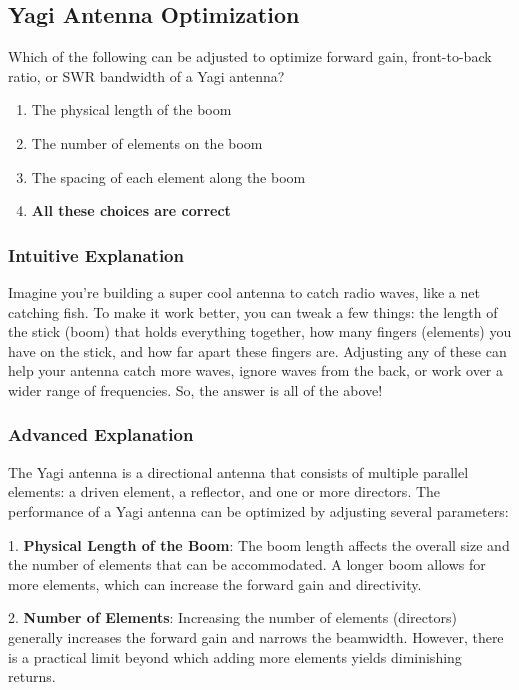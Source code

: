 \subsection{Yagi Antenna Optimization}
\label{G9C10}

\begin{tcolorbox}[colback=gray!10!white,colframe=black!75!black,title=G9C10]
Which of the following can be adjusted to optimize forward gain, front-to-back ratio, or SWR bandwidth of a Yagi antenna?
\begin{enumerate}[label=\Alph*.]
    \item The physical length of the boom
    \item The number of elements on the boom
    \item The spacing of each element along the boom
    \item \textbf{All these choices are correct}
\end{enumerate}
\end{tcolorbox}

\subsubsection{Intuitive Explanation}
Imagine you're building a super cool antenna to catch radio waves, like a net catching fish. To make it work better, you can tweak a few things: the length of the stick (boom) that holds everything together, how many fingers (elements) you have on the stick, and how far apart these fingers are. Adjusting any of these can help your antenna catch more waves, ignore waves from the back, or work over a wider range of frequencies. So, the answer is all of the above!

\subsubsection{Advanced Explanation}
The Yagi antenna is a directional antenna that consists of multiple parallel elements: a driven element, a reflector, and one or more directors. The performance of a Yagi antenna can be optimized by adjusting several parameters:

1. \textbf{Physical Length of the Boom}: The boom length affects the overall size and the number of elements that can be accommodated. A longer boom allows for more elements, which can increase the forward gain and directivity.

2. \textbf{Number of Elements}: Increasing the number of elements (directors) generally increases the forward gain and narrows the beamwidth. However, there is a practical limit beyond which adding more elements yields diminishing returns.

